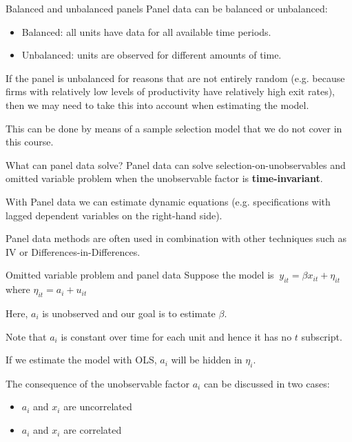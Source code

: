 \documentclass{beamer}
\begin{document}
\begin{frame}{Balanced and unbalanced panels}
Panel data can be balanced or unbalanced:
\begin{itemize}
\item Balanced: all units have data for all available time periods.
\item Unbalanced: units are observed for different amounts of time.
\end{itemize}\medskip

If the panel is unbalanced for reasons that are not entirely random (e.g. because firms with relatively low levels of productivity have relatively high exit rates), then we may
need to take this into account when estimating the model.\bigskip

This can be done by means of a sample selection model that we do not cover in this course.

\end{frame}

\begin{frame}{What can panel data solve?}
Panel data can solve selection-on-unobservables and omitted variable problem when the unobservable factor is {\color{red}\textbf{time-invariant}}.\bigskip

With Panel data we can estimate dynamic equations (e.g. specifications with lagged dependent
variables on the right-hand side).\bigskip

Panel data methods are often used in combination with other techniques such as IV or Differences-in-Differences.
\end{frame}


\begin{frame}{Omitted variable problem and panel data}
Suppose the model is  $\ y_{it} = \beta x_{it} + \eta_{it}$
where $\eta_{it}= a_i+u_{it}$\medskip

Here, $a_i$ is unobserved and our goal is to estimate $\beta$.\medskip

Note that $a_i$ is constant over time for each unit and hence it has no $t$ subscript.\medskip\pause

If we estimate the model with OLS, $a_i$ will be hidden in $\eta_i$.\medskip

The consequence of the unobservable factor $a_i$ can be discussed in two cases:
\begin{itemize}
\item $a_i$ and $x_i$ are uncorrelated 
\item $a_i$ and $x_i$ are correlated 
\end{itemize} \medskip
{}
\end{frame}
\end{document}
